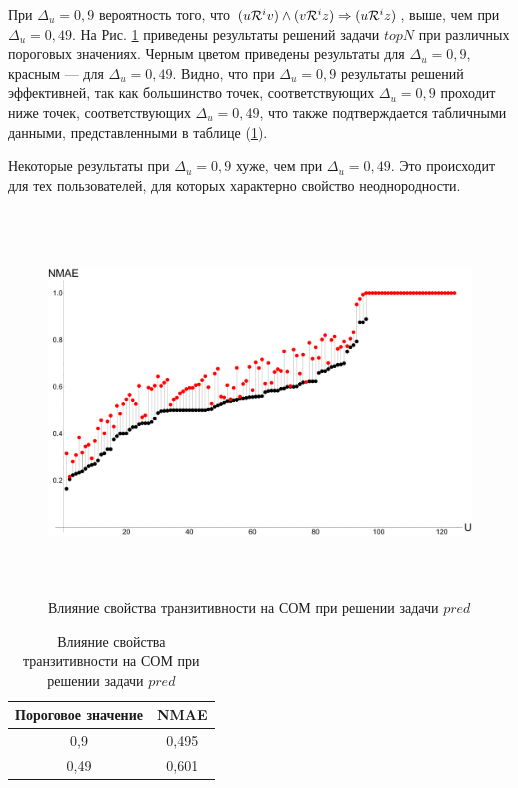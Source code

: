 При $\Delta_u = 0,9$ вероятность того, что $(u \mathcal{R}^i v) \wedge (v \mathcal{R}^i z)
\Rightarrow (u \mathcal{R}^i z)$, выше, чем при $\Delta_u = 0,49$.
На Рис. \ref{pic:predtrans} приведены результаты решений задачи $topN$ при
различных пороговых значениях. Черным цветом приведены результаты для
$\Delta_u = 0,9$, красным --- для $\Delta_u = 0,49$.
Видно, что при $\Delta_u = 0,9$ результаты решений эффективней, так
как большинство точек, соответствующих $\Delta_u = 0,9$ проходит ниже точек,
соответствующих $\Delta_u = 0,49$, что также подтверждается табличными данными,
представленными в таблице (\ref{tbl:predtrans}).

Некоторые результаты при $\Delta_u = 0,9$ хуже, чем при
$\Delta_u = 0,49$. Это происходит для тех пользователей,
для которых характерно свойство неоднородности.

\begin{figure}[H]
	\caption{Влияние свойства транзитивности на СОМ при решении задачи $pred$}
	\label{pic:predtrans}
	\begin{center}
		\includegraphics[width=7in,height=4in]{pics/results/ub_transitivity.pdf}
\end{center}
\end{figure}

\begin{table}[H]
	\caption{Влияние свойства транзитивности на СОМ при решении задачи $pred$}
  \label{tbl:predtrans}
  \begin{center}
	\begin{tabular}{|c|c|}
	  \hline
		Пороговое значение & NMAE \\ \hline
		0,9&0,495 \\ \hline
		0,49&0,601 \\ \hline
	\end{tabular}
  \end{center}
\end{table}

